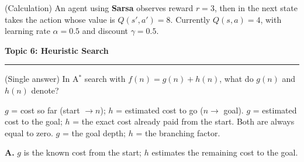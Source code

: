 \documentclass[answers,addpoints]{exam}
\newcommand{\topic}[2]{%
  \vspace{1.0\baselineskip}%
  \noindent\textbf{\large Topic #1: #2}\par
  \noindent\rule{\linewidth}{0.4pt}\par
  \vspace{0.4\baselineskip}}
\begin{document}
\begin{questions}
\question[5] (Calculation) An agent using \textbf{Sarsa} observes reward $r=3$,
then in the next state takes the action whose value is $Q(s',a')=8$. Currently
$Q(s,a)=4$, with learning rate $\alpha=0.5$ and discount $\gamma=0.5$.

\topic{6}{Heuristic Search}

\question[2] (Single answer) In A$^{*}$ search with $f(n)=g(n)+h(n)$, what do
$g(n)$ and $h(n)$ denote?
\begin{choices}
  \CorrectChoice $g$ = cost so far (start $\to n$); $h$ = estimated cost to go ($n\to$ goal).
  \choice $g$ = estimated cost to the goal; $h$ = the exact cost already paid from the start.
  \choice Both are always equal to zero.
  \choice $g$ = the goal depth; $h$ = the branching factor.
\end{choices}
\begin{solution}\textbf{A.} $g$ is the known cost from the start; $h$ estimates the
remaining cost to the goal.\end{solution}


\end{questions}
\end{document}
